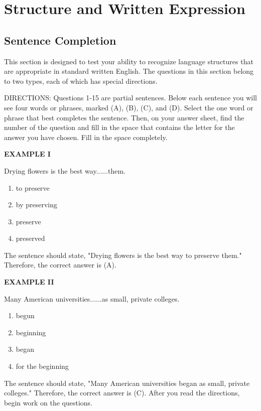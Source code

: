 \documentclass[12pt]{article}
\begin{document}
\section*{Structure and Written Expression}
\subsection*{Sentence Completion}
This section is designed to test your ability to recognize language structures that are appropriate in standard written English. The questions in this section belong to two types, each of which has special directions.\par
DIRECTIONS: Questions 1-15 are partial sentences. Below each sentence you will see four words or phrases, marked (A), (B), (C), and (D). Select the one word or phrase that best completes the sentence. Then, on your answer sheet, find the number of the question and fill in the space that contains the letter for the answer you have chosen. Fill in the space completely.\par
\begin{exampleblock}
\textbf{EXAMPLE I}\par
\noindent Drying flowers is the best way......them.
\begin{enumerate}[label=(\Alph*),leftmargin=*,itemsep=0.2em]
\item to preserve
\item by preserving
\item preserve
\item preserved
\end{enumerate}
\vspace{0.25\baselineskip}
The sentence should state, "Drying flowers is the best way to preserve them." Therefore, the correct answer is (A).\par
\end{exampleblock}
\begin{exampleblock}
\textbf{EXAMPLE II}\par
\noindent Many American universities......as small, private colleges.
\begin{enumerate}[label=(\Alph*),leftmargin=*,itemsep=0.2em]
\item begun
\item beginning
\item began
\item for the beginning
\end{enumerate}
\vspace{0.25\baselineskip}
The sentence should state, "Many American universities began as small, private colleges." Therefore, the correct answer is (C). After you read the directions, begin work on the questions.\par
\end{exampleblock}
\end{document}
